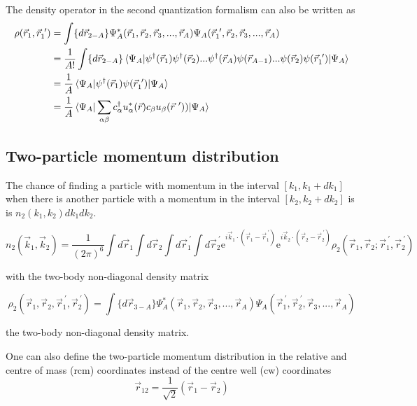 \documentclass[12pt]{article}
\begin{document}
The density operator in the second quantization formalism can also be written as
\begin{align}
\rho(\vec{r}_1,\vec{r}^{\ \prime}_1) & =  \int \{d\vec{r}_{2-A}\} \Psi^*_A(\vec{r}_1,\vec{r}_2,\vec{r}_3, ...,\vec{r}_A)\Psi_A(\vec{r}_1^{\ \prime},\vec{r}_2,\vec{r}_3, ... ,\vec{r}_A) \\
& = \frac{1}{A!} \int \{d\vec{r}_{2-A}\} \braket{\Psi_A|\psi^\dagger(\vec{r}_1) \psi^\dagger(\vec{r}_2) ...\psi^\dagger(\vec{r}_A) \psi(\vec{r}_{A-1}) ...  \psi(\vec{r}_2)\psi(\vec{r}_1^{\ \prime})|\Psi_A } \\
& = \frac{1}{A}\braket{\Psi_A|\psi^\dagger(\vec{r}_1) \psi(\vec{r}_1^{\ \prime})|\Psi_A } \\
& = \frac{1}{A}\braket{\Psi_A|\sum_{\alpha \beta} c^\dagger_{\alpha} u^*_\alpha(\vec{r})c_{\beta} u_\beta(\vec{r}^{\ \prime})) |\Psi_A }
\end{align}




\subsection{Two-particle momentum distribution}

The chance of finding a particle with momentum in the interval $[k_1,k_1+dk_1]$ when there is another particle with a momentum in the interval $[k_2,k_2+dk_2]$ is is $ n_2(k_1,k_2)dk_1dk_2$.

\begin{equation}
n_2(\vec{k}_1,\vec{k}_2)=\frac{1}{(2\pi)^6}\int d\vec{r}_1 \int d\vec{r}_2 \int  
    						d\vec{r}_1^{\ \prime} \int d\vec{r}_2^{\ \prime} 
    						\mathrm{e}^{i\vec{k}_1\cdot (\vec{r}_1-\vec{r}^{\ \prime}_1)} 
    						\mathrm{e}^{i\vec{k}_2\cdot(\vec{r}_2-\vec{r}^{\ \prime}_2)}
    						\rho_2(\vec{r}_1,\vec{r}_2; \vec{r}_1^{\ \prime},\vec{r}_2^{\ \prime})
\end{equation}

with the two-body non-diagonal density matrix


\begin{equation}
\rho_2(\vec{r}_1,\vec{r}_2, \vec{r}_1^{\ \prime},\vec{r}_2^{\ \prime}) = \int \{d\vec{r}_{3-A}\} \Psi^*_A(\vec{r}_1,\vec{r}_2,\vec{r}_3, ... ,\vec{r}_A)\Psi_A(\vec{r}_1^{\ \prime},\vec{r}_2^{\ \prime},\vec{r}_3, ... ,\vec{r}_A)
\end{equation}

the two-body non-diagonal density matrix.

One can also define the two-particle momentum distribution in the relative and centre of mass (rcm) coordinates instead of the centre well (cw) coordinates
\begin{equation}
\vec{r}_{12}= \frac{1}{\sqrt{2}} \left(\vec{r}_1 - \vec{r}_2\right)  
\end{equation}
\end{document}
